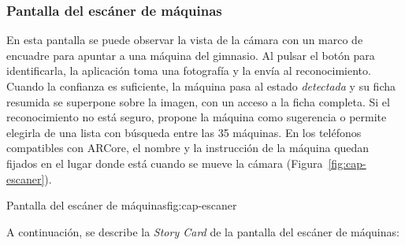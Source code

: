 \subsubsection{Pantalla del escáner de máquinas}

En esta pantalla se puede observar la vista de la cámara con un marco de
encuadre para apuntar a una máquina del gimnasio. Al pulsar el botón para
identificarla, la aplicación toma una fotografía y la envía al reconocimiento.
Cuando la confianza es suficiente, la máquina pasa al estado \emph{detectada}
y su ficha resumida se superpone sobre la imagen, con un acceso a la ficha
completa. Si el reconocimiento no está seguro, propone la máquina como
sugerencia o permite elegirla de una lista con búsqueda entre las 35 máquinas.
En los teléfonos compatibles con ARCore, el nombre y la instrucción de la
máquina quedan fijados en el lugar donde está cuando se mueve la cámara
(Figura~\ref{fig:cap-escaner}).

  {Pantalla del escáner de máquinas}{fig:cap-escaner}

A continuación, se describe la \emph{Story Card} de la pantalla del escáner de máquinas:

